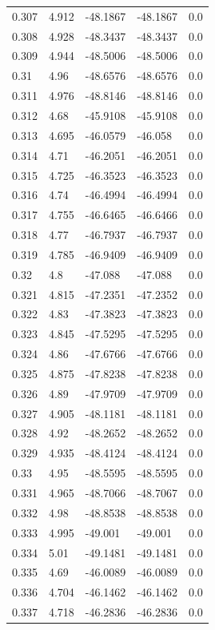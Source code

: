 \begin{table}[H]
\begin{tabular}{lllll}
0.307 & 4.912 & -48.1867 & -48.1867 & 0.0 \\
0.308 & 4.928 & -48.3437 & -48.3437 & 0.0 \\
0.309 & 4.944 & -48.5006 & -48.5006 & 0.0 \\
0.31 & 4.96 & -48.6576 & -48.6576 & 0.0 \\
0.311 & 4.976 & -48.8146 & -48.8146 & 0.0 \\
0.312 & 4.68 & -45.9108 & -45.9108 & 0.0 \\
0.313 & 4.695 & -46.0579 & -46.058 & 0.0 \\
0.314 & 4.71 & -46.2051 & -46.2051 & 0.0 \\
0.315 & 4.725 & -46.3523 & -46.3523 & 0.0 \\
0.316 & 4.74 & -46.4994 & -46.4994 & 0.0 \\
0.317 & 4.755 & -46.6465 & -46.6466 & 0.0 \\
0.318 & 4.77 & -46.7937 & -46.7937 & 0.0 \\
0.319 & 4.785 & -46.9409 & -46.9409 & 0.0 \\
0.32 & 4.8 & -47.088 & -47.088 & 0.0 \\
0.321 & 4.815 & -47.2351 & -47.2352 & 0.0 \\
0.322 & 4.83 & -47.3823 & -47.3823 & 0.0 \\
0.323 & 4.845 & -47.5295 & -47.5295 & 0.0 \\
0.324 & 4.86 & -47.6766 & -47.6766 & 0.0 \\
0.325 & 4.875 & -47.8238 & -47.8238 & 0.0 \\
0.326 & 4.89 & -47.9709 & -47.9709 & 0.0 \\
0.327 & 4.905 & -48.1181 & -48.1181 & 0.0 \\
0.328 & 4.92 & -48.2652 & -48.2652 & 0.0 \\
0.329 & 4.935 & -48.4124 & -48.4124 & 0.0 \\
0.33 & 4.95 & -48.5595 & -48.5595 & 0.0 \\
0.331 & 4.965 & -48.7066 & -48.7067 & 0.0 \\
0.332 & 4.98 & -48.8538 & -48.8538 & 0.0 \\
0.333 & 4.995 & -49.001 & -49.001 & 0.0 \\
0.334 & 5.01 & -49.1481 & -49.1481 & 0.0 \\
0.335 & 4.69 & -46.0089 & -46.0089 & 0.0 \\
0.336 & 4.704 & -46.1462 & -46.1462 & 0.0 \\
0.337 & 4.718 & -46.2836 & -46.2836 & 0.0 \\

\end{tabular}
\end{table}
